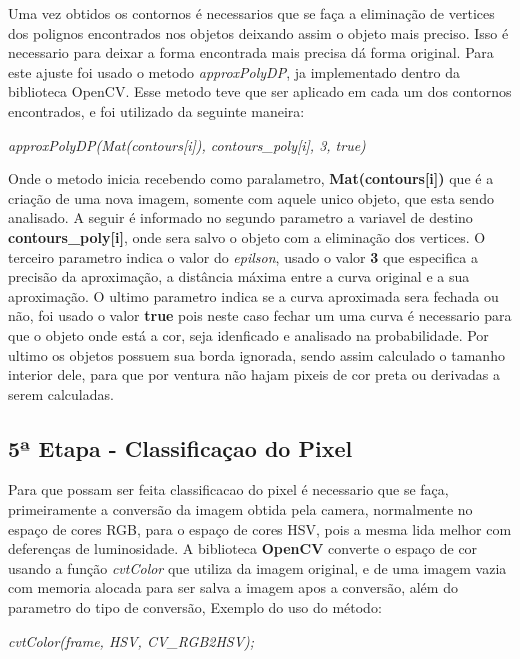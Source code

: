 Uma vez obtidos os contornos é necessarios que se faça a eliminação de vertices dos polignos encontrados nos objetos deixando assim o objeto mais preciso. Isso é necessario para deixar a forma encontrada mais precisa dá forma original. Para este ajuste foi usado o metodo \textit{approxPolyDP}, ja implementado dentro da biblioteca OpenCV. Esse metodo teve que ser aplicado em cada um dos contornos encontrados, e foi utilizado da seguinte maneira:
\begin{center}
\centering \textit{    approxPolyDP(Mat(contours[i]), contours\_poly[i], 3, true)}
\end{center}
 Onde o metodo inicia recebendo como paralametro, \textbf{Mat(contours[i])} que é a criação de uma nova imagem, somente com aquele unico objeto, que esta sendo analisado. A seguir é informado no segundo parametro a variavel de destino \textbf{contours\_poly[i]}, onde sera salvo o objeto com a eliminação dos vertices. O terceiro parametro indica o valor do \textit{epilson}, usado o valor \textbf{3} que especifica a precisão da aproximação, a distância máxima entre a curva original e a sua aproximação\cite{OpenCV}. O ultimo parametro indica se a curva aproximada sera fechada ou não, foi usado o valor \textbf{true} pois neste caso fechar um uma curva é necessario para que o objeto onde está a cor, seja idenficado e analisado na probabilidade.
 Por ultimo os objetos possuem sua borda ignorada, sendo assim calculado o tamanho interior dele, para que por ventura não hajam pixeis de cor preta ou derivadas a serem calculadas.
 
 \subsection{5ª Etapa - Classificaçao do Pixel}

 
 
 Para que possam ser feita classificacao do pixel é necessario que se faça, primeiramente a conversão da imagem obtida pela camera, normalmente no espaço de cores RGB, para o espaço de cores HSV, pois a mesma lida melhor com deferenças de luminosidade. 
 A biblioteca \textbf{OpenCV} converte o espaço de cor usando a função \textit{cvtColor} que utiliza da imagem original, e de uma imagem vazia com memoria alocada para ser salva a imagem apos a conversão, além do parametro do tipo de conversão, Exemplo do uso do método:
\begin{center}
\centering \textit{cvtColor(frame, HSV, CV\_RGB2HSV);}
\end{center}


